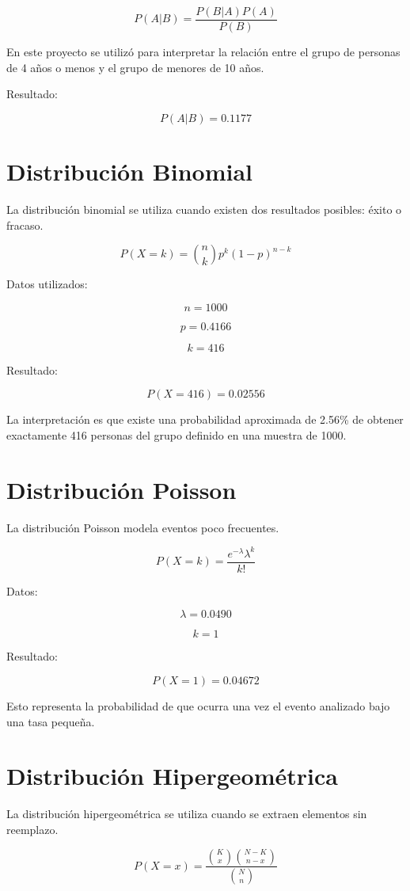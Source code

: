 \documentclass[12pt]{article}
\begin{document}
\[
P(A|B)=\frac{P(B|A)P(A)}{P(B)}
\]

En este proyecto se utilizó para interpretar la relación entre el grupo de personas de 4 años o menos y el grupo de menores de 10 años.

Resultado:

\[
P(A|B)=0.1177
\]

\section{Distribución Binomial}

La distribución binomial se utiliza cuando existen dos resultados posibles: éxito o fracaso.

\[
P(X=k)=\binom{n}{k}p^k(1-p)^{n-k}
\]

Datos utilizados:

\[
n=1000
\]

\[
p=0.4166
\]

\[
k=416
\]

Resultado:

\[
P(X=416)=0.02556
\]

La interpretación es que existe una probabilidad aproximada de 2.56\% de obtener exactamente 416 personas del grupo definido en una muestra de 1000.

\section{Distribución Poisson}

La distribución Poisson modela eventos poco frecuentes.

\[
P(X=k)=\frac{e^{-\lambda}\lambda^k}{k!}
\]

Datos:

\[
\lambda=0.0490
\]

\[
k=1
\]

Resultado:

\[
P(X=1)=0.04672
\]

Esto representa la probabilidad de que ocurra una vez el evento analizado bajo una tasa pequeña.

\section{Distribución Hipergeométrica}

La distribución hipergeométrica se utiliza cuando se extraen elementos sin reemplazo.

\[
P(X=x)=\frac{\binom{K}{x}\binom{N-K}{n-x}}{\binom{N}{n}}
\]
\end{document}
